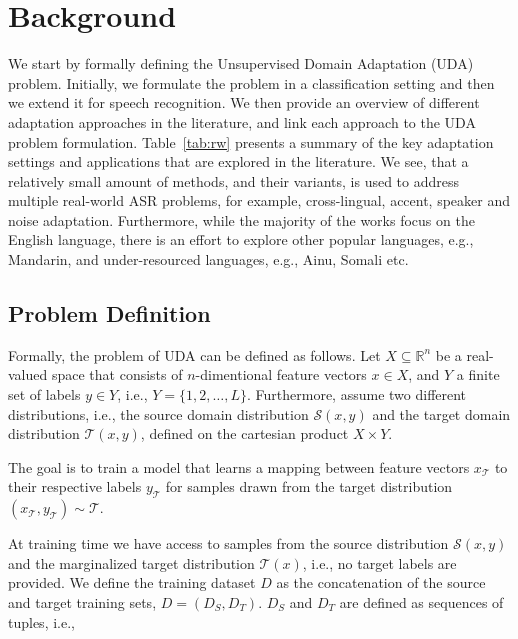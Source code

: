 \documentclass[journal]{IEEEtran}
\begin{document}
\section{Background}
\label{sec:background}
We start by formally defining the Unsupervised Domain Adaptation (UDA) problem. Initially, we formulate the problem in a classification setting and then we extend it for speech recognition. We then provide an overview of different adaptation approaches in the literature, and link each approach to the UDA problem formulation. Table~\ref{tab:rw} presents a summary of the key adaptation settings and applications that are explored in the literature. We see, that a relatively small  amount of methods, and their variants, is used to address multiple real-world ASR problems, for example, cross-lingual, accent, speaker and noise adaptation. Furthermore, while the majority of the works focus on the English language, there is an effort to explore other popular languages, e.g., Mandarin, and under-resourced languages, e.g., Ainu, Somali etc.

\subsection{Problem Definition}
\label{sec:problem-def}

Formally, the problem of UDA can be defined as follows.
Let $X \subseteq \mathbb{R}^n$ be a real-valued space that consists of $n$-dimentional feature vectors $x \in X$, and $Y$ a finite set of labels $y\in Y$, i.e., $Y = \{1, 2, \dots, L\}$.
Furthermore, assume two different distributions, i.e., the source domain distribution $\mathcal{S}(x,y)$ and the target domain distribution $\mathcal{T}(x,y)$,  defined  on the cartesian product $X \times Y$.

The goal is to train a model that learns a mapping between feature vectors $x_{\mathcal{T}}$ to their respective labels $y_{\mathcal{T}}$ for samples drawn from the target distribution $(x_{\mathcal{T}},y_{\mathcal{T}}) \sim \mathcal{T}$.

At training time we have access to samples from the source distribution $\mathcal{S}(x, y)$ and the marginalized target distribution $\mathcal{T}(x)$, i.e., no target labels are provided. We define the training dataset $D$ as the concatenation of the source and target training sets, $D = (D_S, D_T)$. $D_S$ and $D_T$ are defined as sequences of tuples, i.e.,
\end{document}

